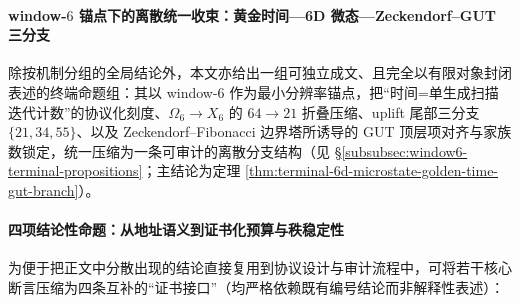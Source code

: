 \paragraph{window-\(6\) 锚点下的离散统一收束：黄金时间—6D 微态—Zeckendorf--GUT 三分支}
除按机制分组的全局结论外，本文亦给出一组可独立成文、且完全以有限对象封闭表述的终端命题组：其以 window-\(6\) 作为最小分辨率锚点，把“时间=单生成扫描迭代计数”的协议化刻度、\(\Omega_6\to X_6\) 的 \(64\to 21\) 折叠压缩、uplift 尾部三分支 \(\{21,34,55\}\)、以及 Zeckendorf--Fibonacci 边界塔所诱导的 GUT 顶层项对齐与家族数锁定，统一压缩为一条可审计的离散分支结构（见 \S\ref{subsubsec:window6-terminal-propositions}；主结论为定理 \ref{thm:terminal-6d-microstate-golden-time-gut-branch}）。

\paragraph{四项结论性命题：从地址语义到证书化预算与秩稳定性}
为便于把正文中分散出现的结论直接复用到协议设计与审计流程中，可将若干核心断言压缩为四条互补的“证书接口”（均严格依赖既有编号结论而非解释性表述）：

